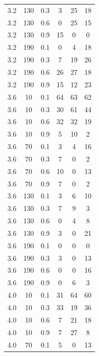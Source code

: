 \documentclass[12pt]{report}
\begin{document}
\begin{table}[H]
\begin{center}
\begin{tabular}{|c@{\hspace{7mm}}|c@{\hspace{7mm}}|c@{\hspace{7mm}}|c|c|c|}
3.2 & 130 & 0.3 & 3 & 25 & 18 \\
3.2 & 130 & 0.6 & 0 & 25 & 15 \\
3.2 & 130 & 0.9 & 15 & 0 & 0 \\
3.2 & 190 & 0.1 & 0 & 4 & 18 \\
3.2 & 190 & 0.3 & 7 & 19 & 26 \\
3.2 & 190 & 0.6 & 26 & 27 & 18 \\
3.2 & 190 & 0.9 & 15 & 12 & 23 \\
3.6 & 10 & 0.1 & 64 & 63 & 62 \\
3.6 & 10 & 0.3 & 30 & 61 & 44 \\
3.6 & 10 & 0.6 & 32 & 32 & 19 \\
3.6 & 10 & 0.9 & 5 & 10 & 2 \\
3.6 & 70 & 0.1 & 3 & 4 & 16 \\
3.6 & 70 & 0.3 & 7 & 0 & 2 \\
3.6 & 70 & 0.6 & 10 & 0 & 13 \\
3.6 & 70 & 0.9 & 7 & 0 & 2 \\
3.6 & 130 & 0.1 & 3 & 6 & 10 \\
3.6 & 130 & 0.3 & 7 & 9 & 3 \\
3.6 & 130 & 0.6 & 0 & 4 & 8 \\
3.6 & 130 & 0.9 & 3 & 0 & 21 \\
3.6 & 190 & 0.1 & 0 & 0 & 0 \\
3.6 & 190 & 0.3 & 3 & 0 & 13 \\
3.6 & 190 & 0.6 & 0 & 0 & 16 \\
3.6 & 190 & 0.9 & 0 & 6 & 3 \\
4.0 & 10 & 0.1 & 31 & 64 & 60 \\
4.0 & 10 & 0.3 & 33 & 19 & 36 \\
4.0 & 10 & 0.6 & 7 & 21 & 18 \\
4.0 & 10 & 0.9 & 7 & 27 & 8 \\
4.0 & 70 & 0.1 & 5 & 0 & 13 \\

\hline
		\end{tabular}
	\end{center}
\end{table}
\end{document}
